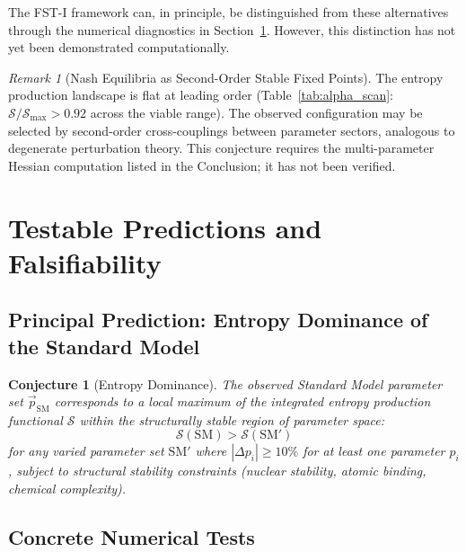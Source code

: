 \documentclass[12pt,a4paper]{article}
\newtheorem{conjecture}{Conjecture}
\theoremstyle{remark}
\newtheorem{remark}{Remark}
\begin{document}
The FST-I framework can, in principle, be distinguished from these alternatives through the numerical diagnostics in Section~\ref{sec:predictions}. However, this distinction has not yet been demonstrated computationally.

\begin{remark}[Nash Equilibria as Second-Order Stable Fixed Points]
\label{rem:degenerate-perturbation}
The entropy production landscape is flat at leading order (Table~\ref{tab:alpha_scan}: $\mathcal{S}/\mathcal{S}_{\max} > 0.92$ across the viable range). The observed configuration may be selected by second-order cross-couplings between parameter sectors, analogous to degenerate perturbation theory. This conjecture requires the multi-parameter Hessian computation listed in the Conclusion; it has not been verified.
\end{remark}

\section{Testable Predictions and Falsifiability}
\label{sec:predictions}

\subsection{Principal Prediction: Entropy Dominance of the Standard Model}

\begin{conjecture}[Entropy Dominance]
\label{conj:entropy-dominance}
The observed Standard Model parameter set $\vec{p}_{\mathrm{SM}}$ corresponds to a local maximum of the integrated entropy production functional $\mathcal{S}$ within the structurally stable region of parameter space:
\begin{equation}
\mathcal{S}(\mathrm{SM}) > \mathcal{S}(\mathrm{SM}')
\end{equation}
for any varied parameter set $\mathrm{SM}'$ where $|\Delta p_i| \geq 10\%$ for at least one parameter $p_i$, subject to structural stability constraints (nuclear stability, atomic binding, chemical complexity).
\end{conjecture}

\subsection{Concrete Numerical Tests}
\end{document}
